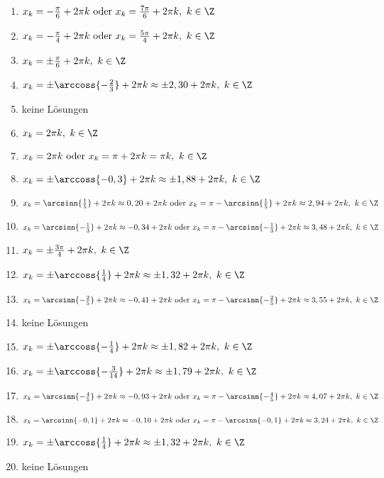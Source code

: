 \begin{Answer}[ref=sincosGleichungenA1]
	\begin{enumerate}[label=\alph*)]
		\item \(x_k=-\frac{\pi}{6} +2\pi k\text{ oder }x_k=\frac{7\pi}{6} +2\pi k,\ k\in\Z\)
		\item \(x_k=-\frac{\pi}{4} +2\pi k\text{ oder }x_k=\frac{5\pi}{4} +2\pi k,\ k\in\Z\)
		\item \(x_k=\pm \frac{\pi}{6} +2\pi k,\ k\in\Z\)
		\item \(x_k=\pm \arccoss{-\frac{2}{3}} +2\pi k\approx \pm 2,30 +2\pi k,\ k\in\Z\)	
		\item keine Lösungen
		\item \(x_k=2\pi k,\ k\in\Z\)
		\item \(x_k=2\pi k\text{ oder }x_k=\pi +2\pi k=\pi k,\ k\in\Z\)
		\item \(x_k=\pm \arccoss{-0,3} +2\pi k\approx \pm 1,88 +2\pi k,\ k\in\Z\)
		\item \(x_k=\arcsinn{\frac{1}{5}} +2\pi k\approx 0,20+2\pi k\text{ oder }x_k=\pi-\arcsinn{\frac{1}{5}} +2\pi k\approx 2,94+2\pi k,\ k\in\Z\)
		\item \(x_k=\arcsinn{-\frac{1}{3}} +2\pi k\approx -0,34+2\pi k\text{ oder }x_k=\pi-\arcsinn{-\frac{1}{3}} +2\pi k\approx 3,48+2\pi k,\ k\in\Z\)
		\item \(x_k=\pm \frac{3\pi}{4} +2\pi k,\ k\in\Z\)
		\item \(x_k=\pm \arccoss{\frac{1}{4}} +2\pi k\approx \pm 1,32 +2\pi k,\ k\in\Z\)
		\item \(x_k=\arcsinn{-\frac{2}{5}} +2\pi k\approx -0,41+2\pi k\text{ oder }x_k=\pi-\arcsinn{-\frac{2}{5}} +2\pi k\approx 3,55+2\pi k,\ k\in\Z\)
		\item keine Lösungen
		\item \(x_k=\pm \arccoss{-\frac{1}{4}} +2\pi k\approx \pm 1,82 +2\pi k,\ k\in\Z\)
		\item \(x_k=\pm \arccoss{-\frac{3}{14}} +2\pi k\approx \pm 1,79 +2\pi k,\ k\in\Z\)
		\item \(x_k=\arcsinn{-\frac{4}{5}} +2\pi k\approx -0,93+2\pi k\text{ oder }x_k=\pi-\arcsinn{-\frac{4}{5}} +2\pi k\approx 4,07+2\pi k,\ k\in\Z\)
		\item \(x_k=\arcsinn{-0,1} +2\pi k\approx -0,10+2\pi k\text{ oder }x_k=\pi-\arcsinn{-0,1} +2\pi k\approx 3,24+2\pi k,\ k\in\Z\)
		\item \(x_k=\pm \arccoss{\frac{1}{4}} +2\pi k\approx \pm 1,32 +2\pi k,\ k\in\Z\)
		\item keine Lösungen

\end{enumerate}
\end{Answer}

